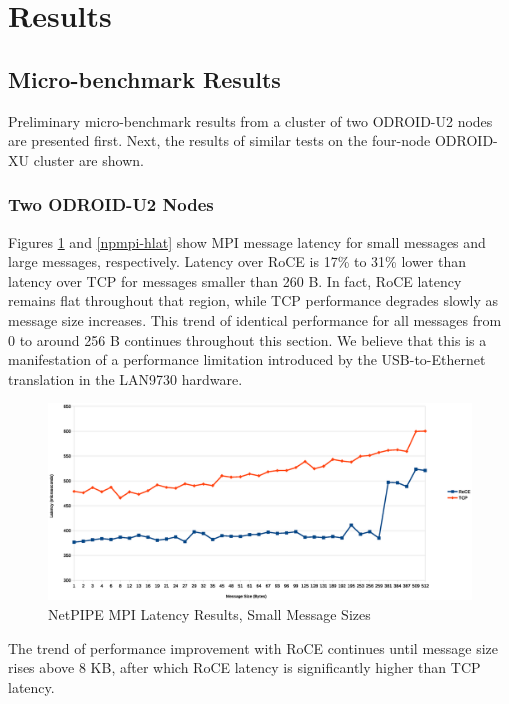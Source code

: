 \documentclass[a4paper]{article}
\begin{document}
\newpage
\section{\textbf{Results}}
\label{results}

\subsection{\textbf{Micro-benchmark Results}}

Preliminary micro-benchmark results from a cluster of two ODROID-U2 nodes are
presented first. Next, the results of similar tests on the four-node ODROID-XU
cluster are shown.

\subsubsection{\textbf{Two ODROID-U2 Nodes}}

Figures \ref{npmpi-llat} and \ref{npmpi-hlat} show MPI message latency for small
messages and large messages, respectively. Latency over RoCE is 17\% to 31\%
lower than latency over TCP for messages smaller than 260 B. In fact, RoCE
latency remains flat throughout that region, while TCP performance degrades
slowly as message size increases. This trend of identical performance for all
messages from 0 to around 256 B continues throughout this section. We believe
that this is a manifestation of a performance limitation introduced by the
USB-to-Ethernet translation in the LAN9730 hardware.

\begin{figure}[H]
\includegraphics[width=\textwidth]{netpipe_lat_small}
\caption{NetPIPE MPI Latency Results, Small Message Sizes}
\label{npmpi-llat}
\end{figure}

The trend of performance improvement with RoCE continues until message size
rises above 8 KB, after which RoCE latency is significantly higher than TCP
latency. %
\end{document}
